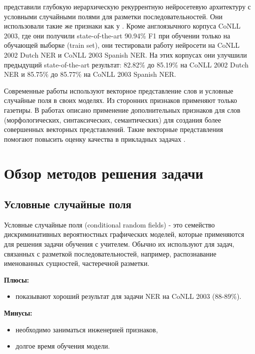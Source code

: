     \citep{DBLP:journals/corr/YangSC16} представили глубокую иерархическую рекуррентную нейросетевую
    архитектуру с условными случайными полями для разметки последовательностей.
    Они использовали такие же признаки как у \citep{collobert2011natural}.
    Кроме англоязычного корпуса CoNLL 2003, где они получили state-of-the-art 90.94\% F1 при обучении
    только на обучающей выборке (train set), они тестировали работу нейросети на CoNLL 2002 Dutch NER и CoNLL 2003 Spanish NER.
    На этих корпусах они улучшили предыдущий state-of-the-art результат:
    82.82\% до 85.19\% на CoNLL 2002 Dutch NER и 85.75\% до 85.77\% на CoNLL 2003 Spanish NER.

    Современные работы используют векторное представление слов
    и условные случайные поля в своих моделях. Из сторонних признаков применяют
    только газетиры. В работах \citep{xu2014rc, bian2014knowledge} описано применение дополнительных признаков для
    слов (морфологических, синтаксических, семантических) для создания более
    совершенных векторных представлений.
    Такие векторные представления помогают повысить оценку качества в
    прикладных задачах \citep{xu2014rc}.

  \section{Обзор методов решения задачи}

    \subsection{Условные случайные поля}

      Условные случайные поля (conditional random fields) - это семейство дискриминативных
      вероятностных графических моделей, которые применяются для решения задачи обучения с учителем.
      Обычно их используют для задач, связанных с разметкой последовательностей, например,
      распознавание именованных сущностей, частеречной разметки.

      \textbf{Плюсы:}
        \begin{itemize}
          \item{показывают хороший результат для задачи NER на CoNLL 2003 (88-89\%).}
        \end{itemize}

      \textbf{Минусы:}
        \begin{itemize}
          \item{необходимо заниматься инженерией признаков,}
          \item{долгое время обучения модели.}
        \end{itemize}


